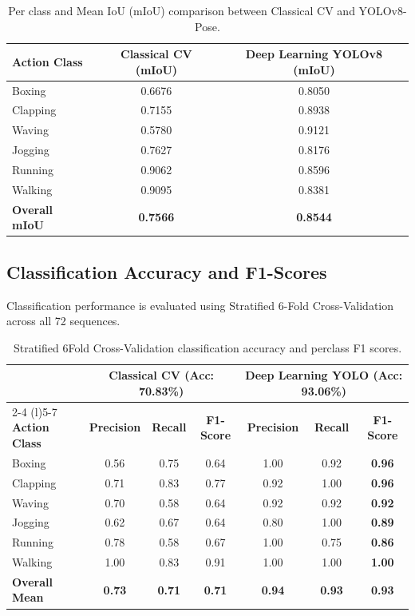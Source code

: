 \documentclass[11pt,a4paper]{article}
\begin{document}
\begin{table}[H]
\centering
\caption{Per class and Mean IoU (mIoU) comparison between Classical CV and YOLOv8-Pose.}
\label{tab:miou_comparison}
\begin{tabular}{lcc}
\toprule
\textbf{Action Class} & \textbf{Classical CV (mIoU)} & \textbf{Deep Learning YOLOv8 (mIoU)} \\
\midrule
Boxing & 0.6676 & 0.8050 \\
Clapping & 0.7155 & 0.8938 \\
Waving & 0.5780 & 0.9121 \\
Jogging & 0.7627 & 0.8176 \\
Running & 0.9062 & 0.8596 \\
Walking & 0.9095 & 0.8381 \\
\midrule
\textbf{Overall mIoU} & \textbf{0.7566} & \textbf{0.8544} \\
\bottomrule
\end{tabular}
\end{table}

\subsection{Classification Accuracy and F1-Scores}
Classification performance is evaluated using Stratified 6-Fold Cross-Validation across all 72 sequences.

\begin{table}[H]
\centering
\small
\caption{Stratified 6Fold Cross-Validation classification accuracy and perclass F1 scores.}
\label{tab:classification_comparison}
\begin{tabular}{l@{\hspace{8pt}}c@{\hspace{8pt}}c@{\hspace{8pt}}c@{\hspace{8pt}}c@{\hspace{8pt}}c@{\hspace{8pt}}c}
\toprule
& \multicolumn{3}{c}{\textbf{Classical CV (Acc: 70.83\%)}} & \multicolumn{3}{c}{\textbf{Deep Learning YOLO (Acc: 93.06\%)}} \\
\cmidrule(r){2-4} \cmidrule(l){5-7}
\textbf{Action Class} & \textbf{Precision} & \textbf{Recall} & \textbf{F1-Score} & \textbf{Precision} & \textbf{Recall} & \textbf{F1-Score} \\
\midrule
Boxing & 0.56 & 0.75 & 0.64 & 1.00 & 0.92 & \textbf{0.96} \\
Clapping & 0.71 & 0.83 & 0.77 & 0.92 & 1.00 & \textbf{0.96} \\
Waving & 0.70 & 0.58 & 0.64 & 0.92 & 0.92 & \textbf{0.92} \\
Jogging & 0.62 & 0.67 & 0.64 & 0.80 & 1.00 & \textbf{0.89} \\
Running & 0.78 & 0.58 & 0.67 & 1.00 & 0.75 & \textbf{0.86} \\
Walking & 1.00 & 0.83 & 0.91 & 1.00 & 1.00 & \textbf{1.00} \\
\midrule
\textbf{Overall Mean} & \textbf{0.73} & \textbf{0.71} & \textbf{0.71} & \textbf{0.94} & \textbf{0.93} & \textbf{0.93} \\
\bottomrule
\end{tabular}
\end{table}
\end{document}
